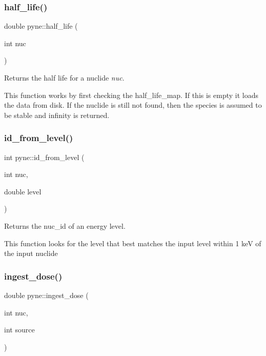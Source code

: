 \subsubsection{\texorpdfstring{half\+\_\+life()}{half\_life()}}
{\footnotesize\ttfamily double pyne\+::half\+\_\+life (\begin{DoxyParamCaption}\item[{int}]{nuc }\end{DoxyParamCaption})}



Returns the half life for a nuclide {\itshape nuc}. 

This function works by first checking the half\+\_\+life\+\_\+map. If this is empty it loads the data from disk. If the nuclide is still not found, then the species is assumed to be stable and infinity is returned. \mbox{\label{namespacepyne_a11f4852ba4824c0e047b509efe0c6b8c}} 
\subsubsection{\texorpdfstring{id\+\_\+from\+\_\+level()}{id\_from\_level()}}
{\footnotesize\ttfamily int pyne\+::id\+\_\+from\+\_\+level (\begin{DoxyParamCaption}\item[{int}]{nuc,  }\item[{double}]{level }\end{DoxyParamCaption})}



Returns the nuc\+\_\+id of an energy level. 

This function looks for the level that best matches the input level within 1 keV of the input nuclide \mbox{\label{namespacepyne_a887bcaf7058c4b8aba27ba942fe7819a}} 
\subsubsection{\texorpdfstring{ingest\+\_\+dose()}{ingest\_dose()}}
{\footnotesize\ttfamily double pyne\+::ingest\+\_\+dose (\begin{DoxyParamCaption}\item[{int}]{nuc,  }\item[{int}]{source }\end{DoxyParamCaption})}




